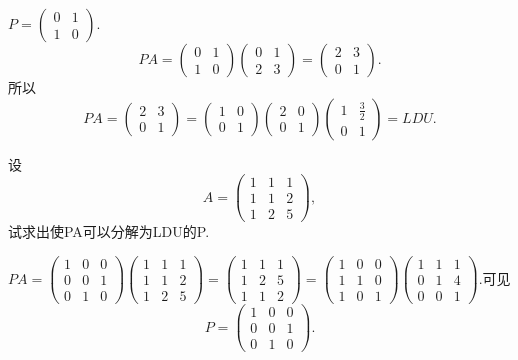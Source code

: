 ﻿\documentclass{book} \usepackage{exsheets} \usepackage{xeCJK}
\begin{document}
\begin{solution}
  $P=
  \begin{pmatrix}
    0&1\\
    1&0
  \end{pmatrix}.  $
$$
PA=
\begin{pmatrix}
  0&1\\
  1&0
\end{pmatrix}
\begin{pmatrix}
  0&1\\
  2&3
\end{pmatrix}=
\begin{pmatrix}
  2&3\\
  0&1
\end{pmatrix}.
$$
所以
$$
PA=
\begin{pmatrix}
  2&3\\
  0&1
\end{pmatrix}=
\begin{pmatrix}
  1&0\\
  0&1
\end{pmatrix}
\begin{pmatrix}
  2&0\\
  0&1
\end{pmatrix}
\begin{pmatrix}
  1&\frac{3}{2}\\
  0&1
\end{pmatrix}=LDU.
$$
\end{solution}
\begin{question}
  设
$$
A=
\begin{pmatrix}
  1&1&1\\
  1&1&2\\
  1&2&5
\end{pmatrix},
$$
试求出使PA可以分解为LDU的P.
\end{question}
\begin{solution}
  $PA=
  \begin{pmatrix}
    1&0&0\\
    0&0&1\\
    0&1&0
  \end{pmatrix}
  \begin{pmatrix}
    1&1&1\\
    1&1&2\\
    1&2&5
  \end{pmatrix}=
  \begin{pmatrix}
    1&1&1\\
    1&2&5\\
    1&1&2
  \end{pmatrix}=
  \begin{pmatrix}
    1&0&0\\
    1&1&0\\
    1&0&1
  \end{pmatrix}
  \begin{pmatrix}
    1&1&1\\
    0&1&4\\
    0&0&1
  \end{pmatrix}.  $可见$$P=
  \begin{pmatrix}
    1&0&0\\
    0&0&1\\
    0&1&0
  \end{pmatrix}.
$$
\end{solution}
\end{document}
